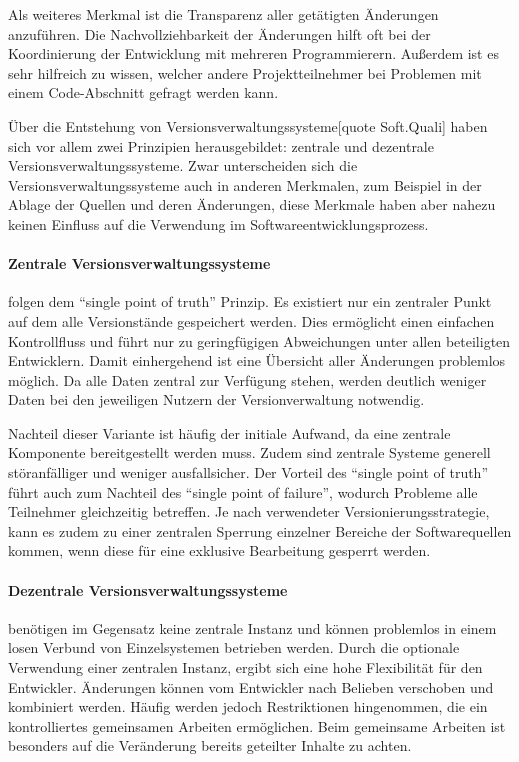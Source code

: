 Als weiteres Merkmal ist die Transparenz aller getätigten Änderungen anzuführen. Die Nachvollziehbarkeit der Änderungen 
hilft oft bei der Koordinierung der Entwicklung mit mehreren Programmierern. Außerdem ist es sehr hilfreich zu wissen, 
welcher andere Projektteilnehmer bei Problemen mit einem Code-Abschnitt gefragt werden kann. 

Über die Entstehung von Versionsverwaltungssysteme[quote Soft.Quali] haben sich vor allem zwei Prinzipien herausgebildet: 
zentrale und dezentrale Versionsverwaltungssysteme. Zwar unterscheiden sich die Versionsverwaltungssysteme auch in 
anderen Merkmalen, zum Beispiel in der Ablage der Quellen und deren Änderungen, diese Merkmale haben aber nahezu keinen 
Einfluss auf die Verwendung im Softwareentwicklungsprozess.

\paragraph{Zentrale Versionsverwaltungssysteme} folgen dem ``single point of truth'' Prinzip. Es existiert nur ein 
zentraler Punkt auf dem alle Versionstände gespeichert werden. Dies ermöglicht einen einfachen Kontrollfluss und führt nur zu geringfügigen Abweichungen unter allen beteiligten Entwicklern. Damit einhergehend ist eine Übersicht aller Änderungen problemlos möglich. 
Da alle Daten zentral zur Verfügung stehen, werden deutlich weniger Daten bei den jeweiligen Nutzern der Versionverwaltung notwendig.

Nachteil dieser Variante ist häufig der initiale Aufwand, da eine zentrale Komponente bereitgestellt werden muss. Zudem 
sind zentrale Systeme generell störanfälliger und weniger ausfallsicher. Der Vorteil des ``single point of truth'' führt 
auch zum Nachteil des ``single point of failure'', wodurch Probleme alle Teilnehmer gleichzeitig betreffen.
Je nach verwendeter Versionierungsstrategie, kann es zudem zu einer zentralen Sperrung einzelner Bereiche der Softwarequellen kommen, wenn diese für eine exklusive Bearbeitung gesperrt werden.

\paragraph{Dezentrale Versionsverwaltungssysteme} benötigen im Gegensatz keine zentrale Instanz und können problemlos in 
einem losen Verbund von Einzelsystemen betrieben werden. 
Durch die optionale Verwendung einer zentralen Instanz, ergibt sich eine hohe Flexibilität für den Entwickler. Änderungen 
können vom Entwickler nach Belieben verschoben und kombiniert werden.
Häufig werden jedoch Restriktionen hingenommen, die ein kontrolliertes gemeinsamen Arbeiten ermöglichen. Beim gemeinsame 
Arbeiten ist besonders auf die Veränderung bereits geteilter Inhalte zu achten.
 
